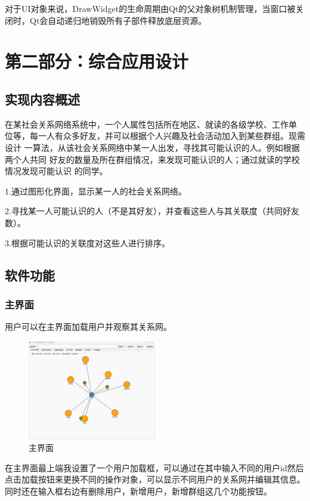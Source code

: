 \documentclass[12pt,a4paper]{article}
\begin{document}
对于UI对象来说，DrawWidget的生命周期由Qt的父对象树机制管理，当窗口被关闭时，Qt会自动递归地销毁所有子部件释放底层资源。

\newpage
\section{第二部分：综合应用设计}
\subsection{实现内容概述}
在某社会关系网络系统中，一个人属性包括所在地区、就读的各级学校、工作单
位等，每一人有众多好友，并可以根据个人兴趣及社会活动加入到某些群组。现需设计
一算法，从该社会关系网络中某一人出发，寻找其可能认识的人。例如根据两个人共同
好友的数量及所在群组情况，来发现可能认识的人；通过就读的学校情况发现可能认识
的同学。

1.通过图形化界面，显示某一人的社会关系网络。

2.寻找某一人可能认识的人（不是其好友），并查看这些人与其关联度（共同好友数）。

3.根据可能认识的关联度对这些人进行排序。

\subsection{软件功能}
\subsubsection{主界面}
用户可以在主界面加载用户并观察其关系网。
\begin{figure}[H]
    \centering
    \includegraphics[width=0.5\textwidth]{pt2-1.png}
    \caption{主界面}
\end{figure}

在主界面最上端我设置了一个用户加载框，可以通过在其中输入不同的用户id然后点击加载按钮来更换不同的操作对象，可以显示不同用户的关系网并编辑其信息。同时还在输入框右边有删除用户，新增用户，新增群组这几个功能按钮。
\end{document}
